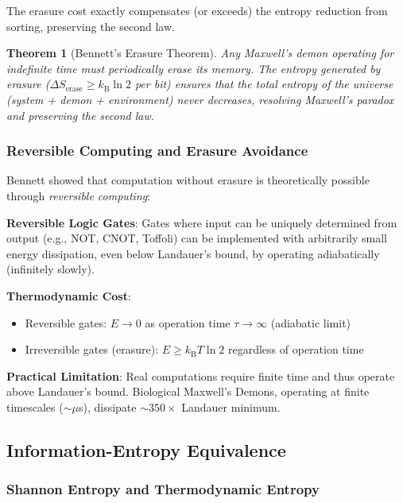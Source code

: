 \documentclass[11pt,a4paper]{article}
\newtheorem{theorem}{Theorem}[section]
\newcommand{\kB}{k_\text{B}}
\begin{document}
The erasure cost exactly compensates (or exceeds) the entropy reduction from sorting, preserving the second law.

\begin{theorem}[Bennett's Erasure Theorem]
\label{thm:bennett_erasure}
Any Maxwell's demon operating for indefinite time must periodically erase its memory. The entropy generated by erasure ($\Delta S_{\text{erase}} \geq \kB \ln 2$ per bit) ensures that the total entropy of the universe (system + demon + environment) never decreases, resolving Maxwell's paradox and preserving the second law.
\end{theorem}

\subsubsection{Reversible Computing and Erasure Avoidance}

Bennett showed that computation without erasure is theoretically possible through \textit{reversible computing}\cite{bennett1973logical}:

\textbf{Reversible Logic Gates}: Gates where input can be uniquely determined from output (e.g., NOT, CNOT, Toffoli) can be implemented with arbitrarily small energy dissipation, even below Landauer's bound, by operating adiabatically (infinitely slowly).

\textbf{Thermodynamic Cost}:
\begin{itemize}
\item Reversible gates: $E \to 0$ as operation time $\tau \to \infty$ (adiabatic limit)
\item Irreversible gates (erasure): $E \geq \kB T \ln 2$ regardless of operation time
\end{itemize}

\textbf{Practical Limitation}: Real computations require finite time and thus operate above Landauer's bound. Biological Maxwell's Demons, operating at finite timescales ($\sim \mu$s), dissipate $\sim 350 \times$ Landauer minimum.

\subsection{Information-Entropy Equivalence}

\subsubsection{Shannon Entropy and Thermodynamic Entropy}
\end{document}
